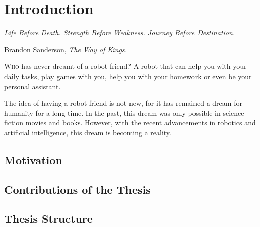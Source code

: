 \chapter{Introduction}\label{ch:introduction}

\setlength{}
\epigraph{\itshape Life Before Death. Strength Before Weakness. Journey Before Destination.}{Brandon Sanderson, \textit{The Way of Kings.}}
\lettrine{\textcolor{accent_color}{W}}{ho} has never dreamt of a robot friend?
A robot that can help you with your daily tasks, play games with you, help you with your homework or even be your personal assistant.

The idea of having a robot friend is not new, for it has remained a dream for humanity for a long time.
In the past, this dream was only possible in science fiction movies and books.
However, with the recent advancements in robotics and artificial intelligence, this dream is becoming a reality.

\section{Motivation}\label{sec:motivation}


\section{Contributions of the Thesis}\label{sec:contributions-of-the-thesis}


\section{Thesis Structure}\label{sec:thesis-structure}